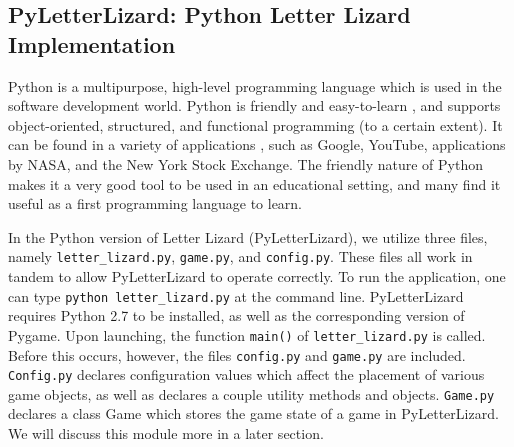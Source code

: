 
\subsection{PyLetterLizard: Python Letter Lizard Implementation}







Python is a multipurpose, high-level programming language which is used  in the software development world. Python is friendly and easy-to-learn \cite{about_python}, and supports object-oriented, structured, and functional programming (to a certain extent). It can be found in a variety of applications \cite{whatis_python}, such as Google, YouTube, applications by NASA, and the New York Stock Exchange. The friendly nature of Python makes it a very good tool to be used in an educational setting, and many find it useful as a first programming language to learn.
	
	
	In the Python version of Letter Lizard (PyLetterLizard), we utilize three files, namely \texttt{letter\_lizard.py}, \texttt{game.py}, and \texttt{config.py}. These files all work in tandem to allow PyLetterLizard to operate correctly. To run the application, one can type \texttt{python letter\_lizard.py} at the command line. PyLetterLizard requires Python 2.7 to be installed, as well as the corresponding version of Pygame.  Upon launching, the function \texttt{main()} of \texttt{letter\_lizard.py} is called. Before this occurs, however, the files \texttt{config.py} and \texttt{game.py} are included. \texttt{Config.py} declares configuration values which affect the placement of various game objects, as well as declares a couple utility methods and objects. \texttt{Game.py} declares a class Game which stores the game state of a game in PyLetterLizard. We will discuss this module more in a later section.
	
